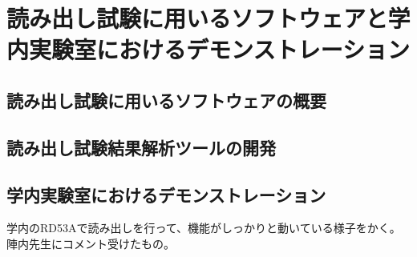 \chapter{読み出し試験に用いるソフトウェアと学内実験室におけるデモンストレーション}

\section{読み出し試験に用いるソフトウェアの概要}

\section{読み出し試験結果解析ツールの開発}

\section{学内実験室におけるデモンストレーション}
学内のRD53Aで読み出しを行って、機能がしっかりと動いている様子をかく。陣内先生にコメント受けたもの。

